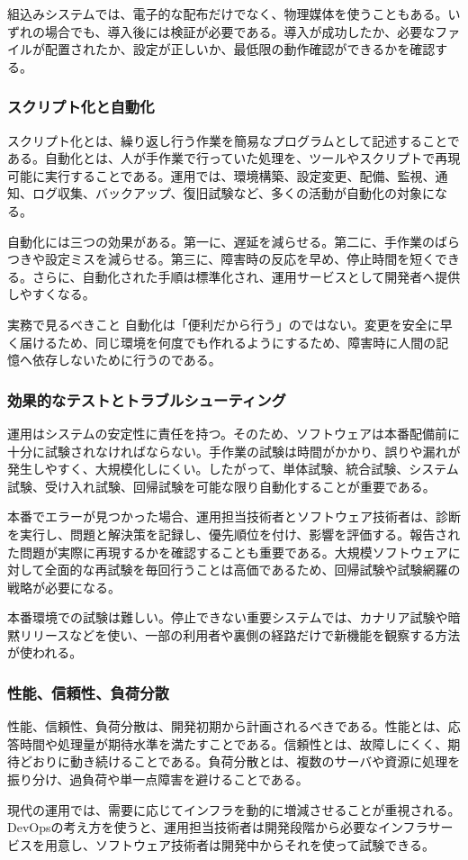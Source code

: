 組込みシステムでは、電子的な配布だけでなく、物理媒体を使うこともある。いずれの場合でも、導入後には検証が必要である。導入が成功したか、必要なファイルが配置されたか、設定が正しいか、最低限の動作確認ができるかを確認する。

\subsubsection{スクリプト化と自動化}

スクリプト化とは、繰り返し行う作業を簡易なプログラムとして記述することである。自動化とは、人が手作業で行っていた処理を、ツールやスクリプトで再現可能に実行することである。運用では、環境構築、設定変更、配備、監視、通知、ログ収集、バックアップ、復旧試験など、多くの活動が自動化の対象になる。

自動化には三つの効果がある。第一に、遅延を減らせる。第二に、手作業のばらつきや設定ミスを減らせる。第三に、障害時の反応を早め、停止時間を短くできる。さらに、自動化された手順は標準化され、運用サービスとして開発者へ提供しやすくなる。

\begin{pointbox}{実務で見るべきこと}
自動化は「便利だから行う」のではない。変更を安全に早く届けるため、同じ環境を何度でも作れるようにするため、障害時に人間の記憶へ依存しないために行うのである。
\end{pointbox}

\subsubsection{効果的なテストとトラブルシューティング}

運用はシステムの安定性に責任を持つ。そのため、ソフトウェアは本番配備前に十分に試験されなければならない。手作業の試験は時間がかかり、誤りや漏れが発生しやすく、大規模化しにくい。したがって、単体試験、統合試験、システム試験、受け入れ試験、回帰試験を可能な限り自動化することが重要である。

本番でエラーが見つかった場合、運用担当技術者とソフトウェア技術者は、診断を実行し、問題と解決策を記録し、優先順位を付け、影響を評価する。報告された問題が実際に再現するかを確認することも重要である。大規模ソフトウェアに対して全面的な再試験を毎回行うことは高価であるため、回帰試験や試験網羅の戦略が必要になる。

本番環境での試験は難しい。停止できない重要システムでは、カナリア試験や暗黙リリースなどを使い、一部の利用者や裏側の経路だけで新機能を観察する方法が使われる。

\subsubsection{性能、信頼性、負荷分散}

性能、信頼性、負荷分散は、開発初期から計画されるべきである。性能とは、応答時間や処理量が期待水準を満たすことである。信頼性とは、故障しにくく、期待どおりに動き続けることである。負荷分散とは、複数のサーバや資源に処理を振り分け、過負荷や単一点障害を避けることである。

現代の運用では、需要に応じてインフラを動的に増減させることが重視される。DevOpsの考え方を使うと、運用担当技術者は開発段階から必要なインフラサービスを用意し、ソフトウェア技術者は開発中からそれを使って試験できる。
